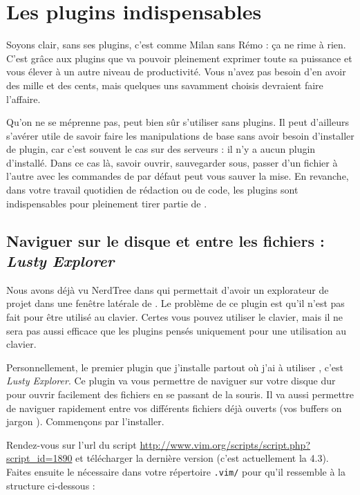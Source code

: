 \chapter{Les plugins indispensables}

Soyons clair, \vim sans ses plugins, c'est comme Milan sans Rémo : ça ne rime à rien. C'est grâce aux plugins que \vim va pouvoir pleinement exprimer toute sa puissance et vous élever à un autre niveau de productivité. Vous n'avez pas besoin d'en avoir des mille et des cents, mais quelques uns savamment choisis devraient faire l'affaire.

Qu'on ne se méprenne pas, \vim peut bien sûr s'utiliser sans plugins. Il peut d'ailleurs s'avérer utile de savoir faire les manipulations de base sans avoir besoin d'installer de plugin, car c'est souvent le cas sur des serveurs : il n'y a aucun plugin d'installé. Dans ce cas là, savoir ouvrir, sauvegarder sous, passer d'un fichier à l'autre avec les commandes de \vim par défaut peut vous sauver la mise. En revanche, dans votre travail quotidien de rédaction ou de code, les plugins sont indispensables pour pleinement tirer partie de \vim.

\section{Naviguer sur le disque et entre les fichiers : \emph{Lusty Explorer}}\label{lusty}

Nous avons déjà vu NerdTree dans  qui permettait d'avoir un explorateur de projet dans une fenêtre latérale de \vim. Le problème de ce plugin est qu'il n'est pas fait pour être utilisé au clavier. Certes vous pouvez utiliser le clavier, mais il ne sera pas aussi efficace que les plugins pensés uniquement pour une utilisation au clavier.

Personnellement, le premier plugin que j'installe partout où j'ai à utiliser \vim, c'est \emph{Lusty Explorer}. Ce plugin va vous permettre de naviguer sur votre disque dur pour ouvrir facilement des fichiers en se passant de la souris. Il va aussi permettre de naviguer rapidement entre vos différents fichiers déjà ouverts (vos buffers on jargon \vim). Commençons par l'installer.

Rendez-vous sur l'url du script \url{http://www.vim.org/scripts/script.php?script\_id=1890} et télécharger la dernière version (c'est actuellement la 4.3). Faites ensuite le nécessaire dans votre répertoire \Verb|.vim/| pour qu'il ressemble à la structure ci-dessous :

